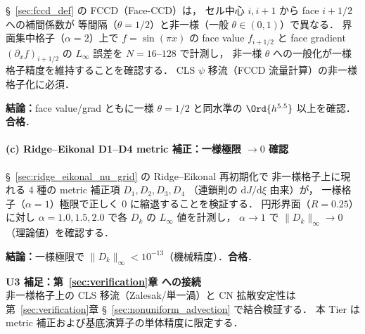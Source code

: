 §~\ref{sec:fccd_def} の FCCD（Face-CCD）は，
セル中心 $i, i+1$ から face $i+1/2$ への補間係数が
等間隔（$\theta = 1/2$）と非一様（一般 $\theta \in (0, 1)$）で異なる．
界面集中格子（$\alpha = 2$）上で
$f = \sin(\pi x)$ の face value $f_{i+1/2}$ と face gradient $(\partial_x f)_{i+1/2}$ の
$L_\infty$ 誤差を $N = 16$--$128$ で計測し，
非一様 $\theta$ への一般化が一様格子精度を維持することを確認する．
CLS $\psi$ 移流（FCCD 流量計算）の非一様格子化に必須．

\noindent\textbf{結論：}face value/grad ともに一様 $\theta = 1/2$ と同水準の
$\Ord{h^{5.5}}$ 以上を確認．\textbf{合格}．

\paragraph{(c) Ridge--Eikonal D1--D4 metric 補正：一様極限 $\to 0$ 確認}
\label{sec:U3_ridge_eikonal_metric}

§~\ref{sec:ridge_eikonal_nu_grid} の Ridge--Eikonal 再初期化で
非一様格子上に現れる 4 種の metric 補正項 $D_1, D_2, D_3, D_4$
（連鎖則の $\mathrm{d}J/\mathrm{d}\xi$ 由来）が，
一様格子（$\alpha = 1$）極限で正しく 0 に縮退することを検証する．
円形界面（$R = 0.25$）に対し
$\alpha = 1.0, 1.5, 2.0$ で各 $D_k$ の $L_\infty$ 値を計測し，
$\alpha \to 1$ で $\|D_k\|_\infty \to 0$（理論値）を確認する．

\noindent\textbf{結論：}一様極限で $\|D_k\|_\infty < 10^{-13}$（機械精度）．\textbf{合格}．

\medskip
\noindent\textbf{U3 補足：第~\ref{sec:verification}章 への接続}\\
非一様格子上の CLS 移流（Zalesak/単一渦）と CN 拡散安定性は
第~\ref{sec:verification}章 §~\ref{sec:nonuniform_advection} で結合検証する．
本 Tier は metric 補正および基底演算子の単体精度に限定する．
